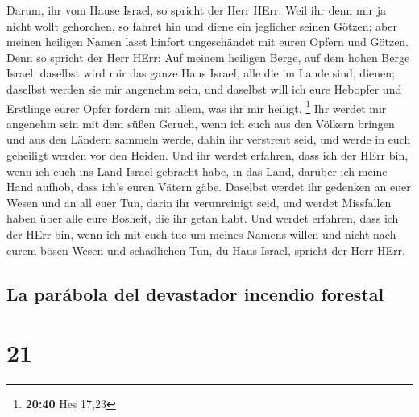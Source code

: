 Darum, ihr vom Hause Israel, so spricht der Herr HErr:
Weil ihr denn mir ja nicht wollt gehorchen, so fahret hin und diene ein
jeglicher seinen Götzen; aber meinen heiligen Namen lasst hinfort
ungeschändet mit euren Opfern und Götzen.  Denn so
spricht der Herr HErr: Auf meinem heiligen Berge, auf dem hohen Berge
Israel, daselbst wird mir das ganze Haus Israel, alle die im Lande sind,
dienen; daselbst werden sie mir angenehm sein, und daselbst will ich
eure Hebopfer und Erstlinge eurer Opfer fordern mit allem, was ihr mir
heiligt. \footnote{\textbf{20:40} Hes 17,23}  Ihr werdet
mir angenehm sein mit dem süßen Geruch, wenn ich euch aus den Völkern
bringen und aus den Ländern sammeln werde, dahin ihr verstreut seid, und
werde in euch geheiligt werden vor den Heiden.  Und ihr
werdet erfahren, dass ich der HErr bin, wenn ich euch ins Land Israel
gebracht habe, in das Land, darüber ich meine Hand aufhob, dass ich's
euren Vätern gäbe.  Daselbst werdet ihr gedenken an euer
Wesen und an all euer Tun, darin ihr verunreinigt seid, und werdet
Missfallen haben über alle eure Bosheit, die ihr getan habt.
 Und werdet erfahren, dass ich der HErr bin, wenn ich mit
euch tue um meines Namens willen und nicht nach eurem bösen Wesen und
schädlichen Tun, du Haus Israel, spricht der Herr HErr.

\hypertarget{la-paruxe1bola-del-devastador-incendio-forestal}{%
\subsection{La parábola del devastador incendio
forestal}\label{la-paruxe1bola-del-devastador-incendio-forestal}}

\hypertarget{section-20}{%
\section{21}\label{section-20}}

